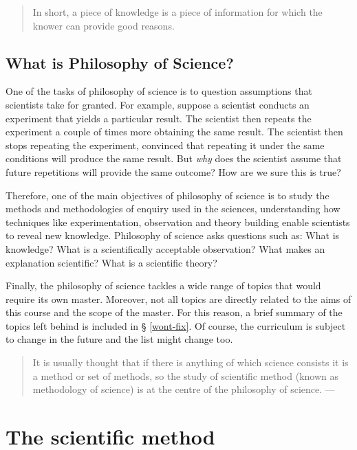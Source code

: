 \documentclass[
]{book}
\begin{document}
\begin{quote}
In short, a piece of knowledge is a piece of information for which the knower can provide good reasons.
\end{quote}

\hypertarget{what-is-philosophy-of-science}{%
\subsection{What is Philosophy of Science?}\label{what-is-philosophy-of-science}}

One of the tasks of philosophy of science is to question assumptions that scientists take for granted. For example, suppose a scientist conducts an experiment that yields a particular result. The scientist then repeats the experiment a couple of times more obtaining the same result. The scientist then stops repeating the experiment, convinced that repeating it under the same conditions will produce the same result. But \emph{why} does the scientist assume that future repetitions will provide the same outcome? How are we sure this is true?

Therefore, one of the main objectives of philosophy of science is to study the methods and methodologies of enquiry used in the sciences, understanding how techniques like experimentation, observation and theory building enable scientists to reveal new knowledge. Philosophy of science asks questions such as: What is knowledge? What is a scientifically acceptable observation? What makes an explanation scientific? What is a scientific theory?

Finally, the philosophy of science tackles a wide range of topics that would require its own master. Moreover, not all topics are directly related to the aims of this course and the scope of the master. For this reason, a brief summary of the topics left behind is included in § \ref{wont-fix}. Of course, the curriculum is subject to change in the future and the list might change too.

\begin{quote}
It is usually thought that if there is anything of which science consists it is a method or set of methods, so the study of scientific method (known as methodology of science) is at the centre of the philosophy of science. --- \citep{ladyman2012understanding}
\end{quote}

\hypertarget{sci-method}{%
\section{The scientific method}\label{sci-method}}
\end{document}
